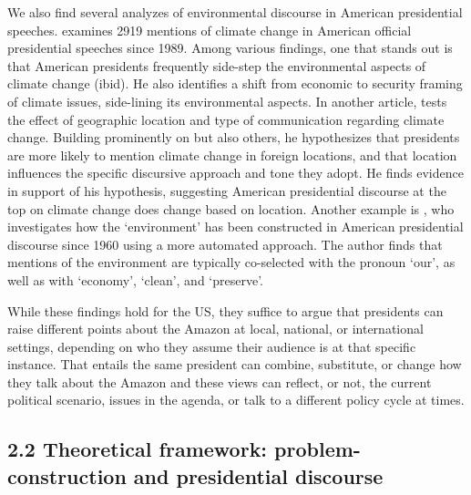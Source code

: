 \documentclass[]{interact}
\theoremstyle{plain}%
\theoremstyle{definition}
\theoremstyle{remark}
\begin{document}
We also find several analyzes of environmental discourse in American
presidential speeches. \citet{calderwood2019} examines 2919 mentions of
climate change in American official presidential speeches since 1989.
Among various findings, one that stands out is that American presidents
frequently side-step the environmental aspects of climate change (ibid).
He also identifies a shift from economic to security framing of climate
issues, side-lining its environmental aspects. In another article,
\citet{calderwood2020} tests the effect of geographic location and type
of communication regarding climate change. Building prominently on
\citet{putnam1988} but also others, he hypothesizes that presidents are
more likely to mention climate change in foreign locations, and that
location influences the specific discursive approach and tone they
adopt. He finds evidence in support of his hypothesis, suggesting
American presidential discourse at the top on climate change does change
based on location. Another example is \citet{bevitori2015}, who
investigates how the `environment' has been constructed in American
presidential discourse since 1960 using a more automated approach. The
author finds that mentions of the environment are typically co-selected
with the pronoun `our', as well as with `economy', `clean', and
`preserve'.

While these findings hold for the US, they suffice to argue that
presidents can raise different points about the Amazon at local,
national, or international settings, depending on who they assume their
audience is at that specific instance. That entails the same president
can combine, substitute, or change how they talk about the Amazon and
these views can reflect, or not, the current political scenario, issues
in the agenda, or talk to a different policy cycle at times.

\hypertarget{theoretical-framework-problem-construction-and-presidential-discourse}{%
\subsection{2.2 Theoretical framework: problem-construction and
presidential
discourse}\label{theoretical-framework-problem-construction-and-presidential-discourse}}
\end{document}
